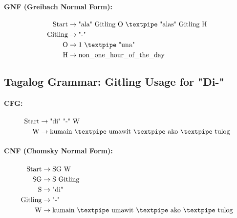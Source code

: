 \paragraph{GNF (Greibach Normal Form):}

\begin{equation*}
    \begin{aligned}
        \text{Start}   & \rightarrow \text{"ala" Gitling O {\textpipe} "alas" Gitling H}\\
        \text{Gitling} & \rightarrow \text{"-"}\\
        \text{O}   & \rightarrow \text{1 {\textpipe} "una"}\\
        \text{H}   & \rightarrow \text{non\_one\_hour\_of\_the\_day}
    \end{aligned}
\end{equation*}

\subsection{Tagalog Grammar: Gitling Usage for "Di-"}

\paragraph{CFG:}

\begin{equation*}
    \begin{aligned}
        \text{Start}  & \rightarrow \text{"di" "-" W}   \\
        \text{W} & \rightarrow \text{kumain {\textpipe} umawit {\textpipe} ako {\textpipe} tulog}   \\
    \end{aligned}
\end{equation*}

\paragraph{CNF (Chomsky Normal Form):}

\begin{equation*}
    \begin{aligned}
        \text{Start}   & \rightarrow \text{SG W} \\
        \text{SG}      & \rightarrow \text{S Gitling}\\
        \text{S}    & \rightarrow \text{"di"}\\        
        \text{Gitling} & \rightarrow \text{"-"}\\
        \text{W} & \rightarrow \text{kumain {\textpipe} umawit {\textpipe} ako {\textpipe} tulog}   \\
    \end{aligned}
\end{equation*}

